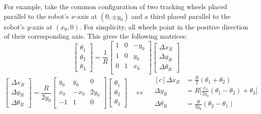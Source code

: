 \documentclass{article}
\begin{document}
For example, take the common configuration of two tracking wheels placed parallel to the robot's $x$-axis at $(0,\pm y_0)$ and a third placed parallel to the robot's $y$-axis at $(x_0,0)$. For simplicity, all wheels point in the positive direction of their corresponding axis. This gives the following matrices:
\begin{equation*}
    \begin{bmatrix}
        \theta_1\\
        \theta_2\\
        \theta_3
    \end{bmatrix}
    =
    \frac{1}{R}
    \begin{bmatrix}
        1 & 0 & -y_0 \\
        1 & 0 & y_0 \\
        0 & 1 & x_0 \\
    \end{bmatrix}
    \begin{bmatrix}
        \Delta x_R\\
        \Delta y_R\\
        \Delta \theta_R
    \end{bmatrix}
\end{equation*}
\begin{equation*}
    \begin{bmatrix}
        \Delta x_R\\
        \Delta y_R\\
        \Delta \theta_R
    \end{bmatrix}
    =
    \frac{R}{2y_0}
    \begin{bmatrix}
        y_0 & y_0 & 0\\
        x_0 & -x_0 & 2y_0\\
        -1 & 1 & 0\\
    \end{bmatrix}
    \begin{bmatrix}
        \theta_1\\
        \theta_2\\
        \theta_3
    \end{bmatrix}
    \quad\leftrightarrow\quad
    \begin{aligned}[c]
        \Delta x_R &= \frac{R}{2}(\theta_1 + \theta_2)\\
        \Delta y_R &= R\bigg[\frac{x_0}{2y_0}(\theta_1 - \theta_2) + \theta_3\bigg]\\
        \Delta \theta_R &= \frac{R}{2y_0}(\theta_2 - \theta_1)
    \end{aligned}
\end{equation*}
\end{document}
